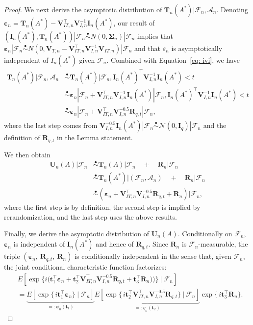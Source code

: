 \documentclass[12pt]{article}
\newcommand{\bI}{\boldsymbol{I}}
\newcommand{\bU}{\boldsymbol{U}}
\newcommand{\bR}{\boldsymbol{R}}
\newcommand{\bV}{\boldsymbol{V}}
\newcommand{\bT}{\boldsymbol{T}}
\newcommand{\bt}{\boldsymbol{t}}
\newcommand{\bSigma}{\mathbf{\Sigma}}
\newcommand{\bvarepsilon}{\boldsymbol{\varepsilon}}
\begin{document}
\begin{proof}
We next derive the asymptotic distribution of $\bT_n(A^*) | \mathcal{F}_n, \mathcal{A}_n$. Denoting $\bvarepsilon_n = \bT_n(A^*) -  \bV_{IT,n}^\top   \bV_{I,n}^{-1}\bI_n(A^*)$, our result of $(\bI_n(A^*), \bT_n(A^*)) | \mathcal{F}_n \overset{\bullet}{\sim} N(0, \bSigma_n) | \mathcal{F}_n$ implies that $\bvarepsilon_n | \mathcal{F}_n \overset{\bullet}{\sim} N(0, \bV_{T,n} - \bV_{IT,n}^\top \bV_{I,n}^{-1}\bV_{IT,n}) | \mathcal{F}_n$ and that $\varepsilon_n$ is asymptotically independent of $I_n(A^*)$ given $\mathcal{F}_n$. Combined with Equation~\eqref{eq: ivi}, we have
\begin{align*}
    \bT_n(A^*)| \mathcal{F}_n, \mathcal{A}_n &\overset{\bullet}{\sim} \bT_n(A^*)| \mathcal{F}_n, \bI_n(A^*)^\top \bV_{I,n}^{-1}\bI_n(A^*)< t \\
    &\overset{\bullet}{\sim} \bvarepsilon_n| \mathcal{F}_n +  \bV_{IT,n}^\top   \bV_{I,n}^{-1}\bI_n(A^*)| \mathcal{F}_n, \bI_n(A^*)^\top \bV_{I,n}^{-1}\bI_n(A^*)< t \\
    &\overset{\bullet}{\sim}\bvarepsilon_n| \mathcal{F}_n +  \bV_{IT,n}^\top   \bV_{I,n}^{-0.5} \bR_{q,t} | \mathcal{F}_n,
\end{align*}
where the last step comes from $\bV_{I,n}^{-0.5} \bI_n(A^*)| \mathcal{F}_n \overset{\bullet}{\sim} \mathcal{N}(0, \bI_q)| \mathcal{F}_n$ and the definition of $\bR_{q,t}$ in the Lemma statement.

We then obtain
\begin{align*}
    \bU_n(A) |\mathcal{F}_n  &\overset{\bullet}{\sim} \bT_n(A) | \mathcal{F}_n\quad  + \quad  \bR_n  | \mathcal{F}_n \\
    &\overset{\bullet}{\sim} \bT_n(A^*)| (\mathcal{F}_n, \mathcal{A}_n) \quad + \quad \bR_n  | \mathcal{F}_n \\
    &\overset{\bullet}{\sim} (\bvarepsilon_n +  \bV_{IT,n}^\top   \bV_{I,n}^{-0.5} \bR_{q,t} + \bR_n)  | \mathcal{F}_n,
\end{align*}
where the first step is by definition, the second step is implied by rerandomization, and the last step uses the above results. 

Finally, we derive the asymptotic distribution of $\bU_n(A)$.
Conditionally on $\mathcal F_n$, $\bvarepsilon_n$ is independent of $\bI_n(A^*)$ and hence of
$\bR_{q,t}$. Since $\bR_n$ is $\mathcal F_n$-measurable, the triple
$(\bvarepsilon_n,\ \bR_{q,t},\ \bR_n)$ is conditionally independent in the sense that, given $\mathcal F_n$,
the joint conditional characteristic function factorizes:
\begin{align*}
& E\!\left[\exp\!\Big\{i\big(\bt_1^\top \bvarepsilon_n
+ \bt_2^\top \bV_{IT,n}^\top   \bV_{I,n}^{-0.5} \bR_{q,t}  + \bt_3^\top \bR_n)\big)\Big\}\ \Big|\ \mathcal F_n\right]\\
&=
\underbrace{E\!\left[\exp\{\,i \bt_1^\top \bvarepsilon_n\}\ \Big|\ \mathcal F_n\right]}_{=: \psi_{n}(\bt_1)}
\underbrace{E\!\left[\exp\{\,i \bt_2^\top  \bV_{IT,n}^\top   \bV_{I,n}^{-0.5} \bR_{q,t}\}\ \Big|\ \mathcal F_n\right]}_{=: \eta_{n}(\bt_2)}
 \exp\{\,i \bt_3^\top \bR_n\}.    
\end{align*}


\end{proof}
\end{document}
